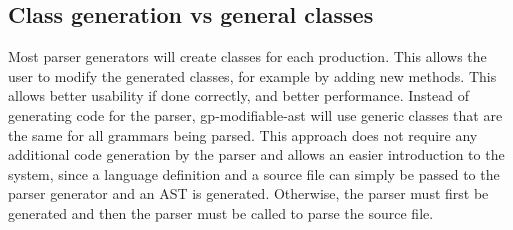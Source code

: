 
\subsection{Class generation vs general classes}

Most parser generators will create classes for each production. 
This allows the user to modify the generated classes, for example by adding new methods. 
This allows better usability if done correctly, and better performance. 
Instead of generating code for the parser, gp-modifiable-ast will use generic classes that are the same for all grammars being parsed. 
This approach does not require any additional code generation by the parser and allows an easier introduction to the system, since a language definition and a source file can simply be passed to the parser generator and an 
AST is generated. Otherwise, the parser must first be generated and then the parser must be called to parse the source file.